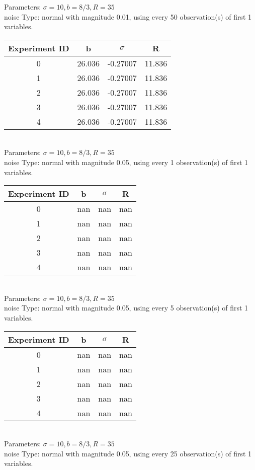 \begin{multicols}{3}
Parameters: $\sigma=10, b=8/3, R=35$\\
noise Type: normal with magnitude 0.01, using every 50 observation(s) of first 1 variables.\\
\begin{tabular}{cccc}
\hline Experiment ID & b & $\sigma$ & R \\ \hline 
0 & 26.036 & -0.27007 & 11.836\\ \hline 
 1 & 26.036 & -0.27007 & 11.836\\ \hline 
 2 & 26.036 & -0.27007 & 11.836\\ \hline 
 3 & 26.036 & -0.27007 & 11.836\\ \hline 
 4 & 26.036 & -0.27007 & 11.836\\ \hline 
 \end{tabular}\\
Parameters: $\sigma=10, b=8/3, R=35$\\
noise Type: normal with magnitude 0.05, using every 1 observation(s) of first 1 variables.\\
\begin{tabular}{cccc}
\hline Experiment ID & b & $\sigma$ & R \\ \hline 
0 & nan & nan & nan\\ \hline 
 1 & nan & nan & nan\\ \hline 
 2 & nan & nan & nan\\ \hline 
 3 & nan & nan & nan\\ \hline 
 4 & nan & nan & nan\\ \hline 
 \end{tabular}\\
Parameters: $\sigma=10, b=8/3, R=35$\\
noise Type: normal with magnitude 0.05, using every 5 observation(s) of first 1 variables.\\
\begin{tabular}{cccc}
\hline Experiment ID & b & $\sigma$ & R \\ \hline 
0 & nan & nan & nan\\ \hline 
 1 & nan & nan & nan\\ \hline 
 2 & nan & nan & nan\\ \hline 
 3 & nan & nan & nan\\ \hline 
 4 & nan & nan & nan\\ \hline 
 \end{tabular}\\
Parameters: $\sigma=10, b=8/3, R=35$\\
noise Type: normal with magnitude 0.05, using every 25 observation(s) of first 1 variables.\\

\end{multicols}
